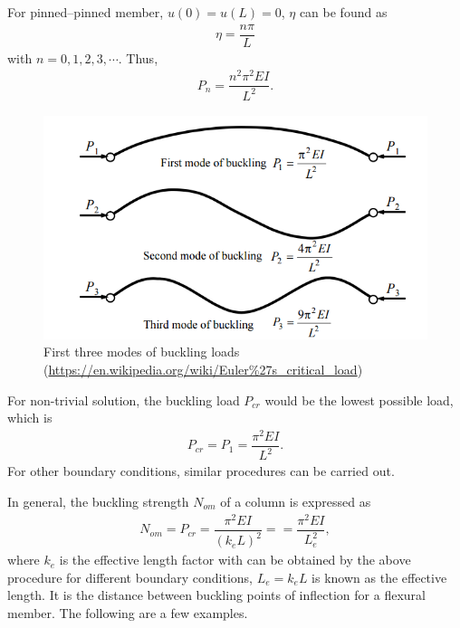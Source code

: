 For pinned--pinned member, $u(0)=u(L)=0$, $\eta$ can be found as
\begin{gather*}
\eta=\dfrac{n\pi}{L}
\end{gather*}
with $n=0,1,2,3,\cdots$. Thus,
\begin{gather*}
P_n=\dfrac{n^2\pi^2EI}{L^2}.
\end{gather*}
\begin{figure}[H]
\centering
\includegraphics[width=12cm]{PIC/CH04/BMODE}
\caption{First three modes of buckling loads (\href{https://en.wikipedia.org/wiki/Euler\%27s_critical_load}{\url{https://en.wikipedia.org/wiki/Euler\%27s_critical_load}})}
\end{figure}

For non-trivial solution, the buckling load $P_{cr}$ would be the lowest possible load, which is
\begin{gather*}
P_{cr}=P_1=\dfrac{\pi^2EI}{L^2}.
\end{gather*}
For other boundary conditions, similar procedures can be carried out.

In general, the buckling strength $N_{om}$ of a column is expressed as
\begin{gather*}
N_{om}=P_{cr}=\dfrac{\pi^2EI}{\left(k_eL\right)^2}==\dfrac{\pi^2EI}{L_e^2},
\end{gather*}
where $k_e$ is the effective length factor with can be obtained by the above procedure for different boundary conditions, $L_e=k_eL$ is known as the effective length. It is the distance between buckling points of inflection for a flexural member. The following are a few examples.
\begin{figure}[H]
\footnotesize\centering

\end{figure}

